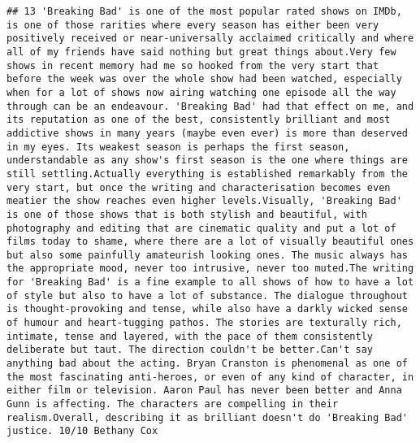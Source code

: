\documentclass[
]{article}
\begin{document}
\begin{verbatim}
## 13 'Breaking Bad' is one of the most popular rated shows on IMDb, is one of those rarities where every season has either been very positively received or near-universally acclaimed critically and where all of my friends have said nothing but great things about.Very few shows in recent memory had me so hooked from the very start that before the week was over the whole show had been watched, especially when for a lot of shows now airing watching one episode all the way through can be an endeavour. 'Breaking Bad' had that effect on me, and its reputation as one of the best, consistently brilliant and most addictive shows in many years (maybe even ever) is more than deserved in my eyes. Its weakest season is perhaps the first season, understandable as any show's first season is the one where things are still settling.Actually everything is established remarkably from the very start, but once the writing and characterisation becomes even meatier the show reaches even higher levels.Visually, 'Breaking Bad' is one of those shows that is both stylish and beautiful, with photography and editing that are cinematic quality and put a lot of films today to shame, where there are a lot of visually beautiful ones but also some painfully amateurish looking ones. The music always has the appropriate mood, never too intrusive, never too muted.The writing for 'Breaking Bad' is a fine example to all shows of how to have a lot of style but also to have a lot of substance. The dialogue throughout is thought-provoking and tense, while also have a darkly wicked sense of humour and heart-tugging pathos. The stories are texturally rich, intimate, tense and layered, with the pace of them consistently deliberate but taut. The direction couldn't be better.Can't say anything bad about the acting. Bryan Cranston is phenomenal as one of the most fascinating anti-heroes, or even of any kind of character, in either film or television. Aaron Paul has never been better and Anna Gunn is affecting. The characters are compelling in their realism.Overall, describing it as brilliant doesn't do 'Breaking Bad' justice. 10/10 Bethany Cox

\end{verbatim}
\end{document}

